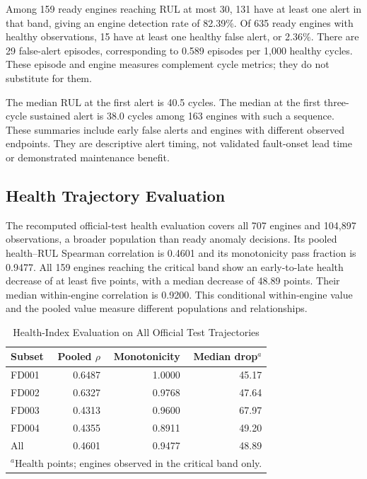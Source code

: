\documentclass[conference]{IEEEtran}
\begin{document}
Among 159 ready engines reaching RUL at most 30, 131 have at least one alert in that band, giving an engine detection rate of 82.39\%. Of 635 ready engines with healthy observations, 15 have at least one healthy false alert, or 2.36\%. There are 29 false-alert episodes, corresponding to 0.589 episodes per 1,000 healthy cycles. These episode and engine measures complement cycle metrics; they do not substitute for them.

The median RUL at the first alert is 40.5 cycles. The median at the first three-cycle sustained alert is 38.0 cycles among 163 engines with such a sequence. These summaries include early false alerts and engines with different observed endpoints. They are descriptive alert timing, not validated fault-onset lead time or demonstrated maintenance benefit.

\subsection{Health Trajectory Evaluation}
The recomputed official-test health evaluation covers all 707 engines and 104,897 observations, a broader population than ready anomaly decisions. Its pooled health--RUL Spearman correlation is 0.4601 and its monotonicity pass fraction is 0.9477. All 159 engines reaching the critical band show an early-to-late health decrease of at least five points, with a median decrease of 48.89 points. Their median within-engine correlation is 0.9200. This conditional within-engine value and the pooled value measure different populations and relationships.

\begin{table}[t]
\caption{Health-Index Evaluation on All Official Test Trajectories}
\label{tab:health}
\centering
\begin{tabular}{lrrr}
\toprule
Subset & Pooled $\rho$ & Monotonicity & Median drop$^{a}$\\
\midrule
FD001 & 0.6487 & 1.0000 & 45.17\\
FD002 & 0.6327 & 0.9768 & 47.64\\
FD003 & 0.4313 & 0.9600 & 67.97\\
FD004 & 0.4355 & 0.8911 & 49.20\\
All & 0.4601 & 0.9477 & 48.89\\
\bottomrule
\multicolumn{4}{l}{\footnotesize $^{a}$Health points; engines observed in the critical band only.}
\end{tabular}
\end{table}
\end{document}
